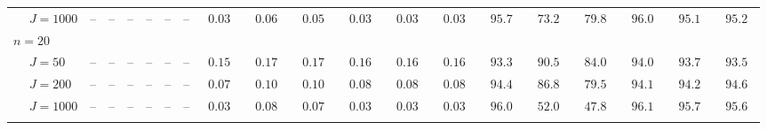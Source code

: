 \begin{sidewaystable}
\begin{threeparttable}
\begin{tabular}{llcccccccccccccccccc}
 & \nopagebreak $\;J=1000$  & \phantom{00}--\phantom{00} & \phantom{00}--\phantom{00} & \phantom{00}--\phantom{00} & \phantom{00}--\phantom{00} & \phantom{00}--\phantom{00} & \phantom{00}--\phantom{00} & $\phantom{0}0.03\phantom{0}$ & $\phantom{0}0.06\phantom{0}$ & $\phantom{0}0.05\phantom{0}$ & $\phantom{0}0.03\phantom{0}$ & $\phantom{0}0.03\phantom{0}$ & $\phantom{0}0.03\phantom{0}$ & $\phantom{0}95.7\phantom{0}$ & $\phantom{0}73.2\phantom{0}$ & $\phantom{0}79.8\phantom{0}$ & $\phantom{0}96.0\phantom{0}$ & $\phantom{0}95.1\phantom{0}$ & $\phantom{0}95.2\phantom{0}$ \\
\multicolumn{4}{l}{$n=20$} \\  & \nopagebreak $\;J=50$  & \phantom{00}--\phantom{00} & \phantom{00}--\phantom{00} & \phantom{00}--\phantom{00} & \phantom{00}--\phantom{00} & \phantom{00}--\phantom{00} & \phantom{00}--\phantom{00} & $\phantom{0}0.15\phantom{0}$ & $\phantom{0}0.17\phantom{0}$ & $\phantom{0}0.17\phantom{0}$ & $\phantom{0}0.16\phantom{0}$ & $\phantom{0}0.16\phantom{0}$ & $\phantom{0}0.16\phantom{0}$ & $\phantom{0}93.3\phantom{0}$ & $\phantom{0}90.5\phantom{0}$ & $\phantom{0}84.0\phantom{0}$ & $\phantom{0}94.0\phantom{0}$ & $\phantom{0}93.7\phantom{0}$ & $\phantom{0}93.5\phantom{0}$ \\
 & \nopagebreak $\;J=200$  & \phantom{00}--\phantom{00} & \phantom{00}--\phantom{00} & \phantom{00}--\phantom{00} & \phantom{00}--\phantom{00} & \phantom{00}--\phantom{00} & \phantom{00}--\phantom{00} & $\phantom{0}0.07\phantom{0}$ & $\phantom{0}0.10\phantom{0}$ & $\phantom{0}0.10\phantom{0}$ & $\phantom{0}0.08\phantom{0}$ & $\phantom{0}0.08\phantom{0}$ & $\phantom{0}0.08\phantom{0}$ & $\phantom{0}94.4\phantom{0}$ & $\phantom{0}86.8\phantom{0}$ & $\phantom{0}79.5\phantom{0}$ & $\phantom{0}94.1\phantom{0}$ & $\phantom{0}94.2\phantom{0}$ & $\phantom{0}94.6\phantom{0}$ \\
 & \nopagebreak $\;J=1000$  & \phantom{00}--\phantom{00} & \phantom{00}--\phantom{00} & \phantom{00}--\phantom{00} & \phantom{00}--\phantom{00} & \phantom{00}--\phantom{00} & \phantom{00}--\phantom{00} & $\phantom{0}0.03\phantom{0}$ & $\phantom{0}0.08\phantom{0}$ & $\phantom{0}0.07\phantom{0}$ & $\phantom{0}0.03\phantom{0}$ & $\phantom{0}0.03\phantom{0}$ & $\phantom{0}0.03\phantom{0}$ & $\phantom{0}96.0\phantom{0}$ & $\phantom{0}52.0\phantom{0}$ & $\phantom{0}47.8\phantom{0}$ & $\phantom{0}96.1\phantom{0}$ & $\phantom{0}95.7\phantom{0}$ & $\phantom{0}95.6\phantom{0}$ \\
[0.5ex]\hline\\[-1.6ex] 

\end{tabular}
\end{threeparttable}
\end{sidewaystable}
